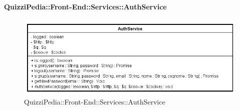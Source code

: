 \paragraph{QuizziPedia::Front-End::Services::AuthService}

\label{QuizziPedia::Front-End::Services::AuthService}
\begin{figure}[ht]
	\centering
	\includegraphics[scale=0.80]{UML/Classi/Front-End/QuizziPedia_Front-end_Services_AuthService.png}
	\caption{QuizziPedia::Front-End::Services::AuthService}
\end{figure} \FloatBarrier
